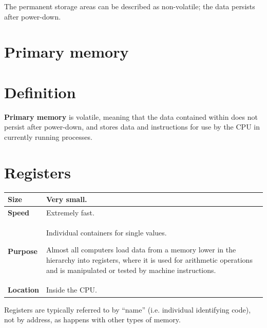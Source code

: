 \documentclass[a4paper]{systems-software}
\begin{document}
The permanent storage areas can be described as non-volatile; the data persists after power-down.


\section{Primary memory}

\section*{Definition}

\textbf{Primary memory} is volatile, meaning that the data contained within does not persist after power-down, and stores data and instructions for use by the CPU in currently running processes.


\section*{Registers}

\begin{longtabu} to \textwidth {| X[1,l] | X[6,l] |}
    \hline
    \textbf{Size} & Very small.
	\\ \hline
	\textbf{Speed} & Extremely fast.
	\\ \hline
	\textbf{Purpose} & Individual containers for single values.
	
	Almost all computers load data from a memory lower in the hierarchy into registers, where it is used for arithmetic operations and is manipulated or tested by machine instructions.
	\\ \hline
	\textbf{Location} & Inside the CPU.
	\\ \hline
\end{longtabu}

Registers are typically referred to by “name” (i.e. individual identifying code), not by address, as happens with other types of memory.
\end{document}
